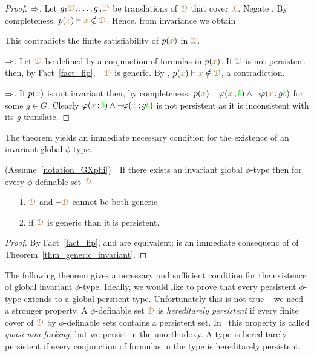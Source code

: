 \begin{proof}
  $\Rightarrow$.
  Let $g_1{\color{brown}\EuScript D},\dots,g_n{\color{brown}\EuScript D}$ be translations of ${\color{brown}\EuScript D}$ that cover ${\color{brown}\EuScript X}$.
  Negate .
  By completeness, $p({\color{brown} x})\vdash {\color{brown}x}\notin{\color{brown}\EuScript D}$.
  Hence, from invariance we obtain


  This contradicts the finite satisfiability of $p({\color{brown} x})$ in ${\color{brown}\EuScript X}$.
  
  $\Rightarrow$.
  Let ${\color{brown}\EuScript D}$ be defined by a conjunction of formulas in $p({\color{brown} x})$.
  If ${\color{brown}\EuScript D}$ is not persistent then, by Fact~\ref{fact_fip}, $\neg{\color{brown}\EuScript D}$ is generic. 
  By , $p({\color{brown} x})\vdash{\color{brown}x}\notin{\color{brown}\EuScript D}$, a contradiction.

  $\Rightarrow$.
  If $p({\color{brown} x})$ is not invariant then, by completeness, $p({\color{brown} x})\vdash\varphi({\color{brown} x}\,;{\color{green} b})\wedge\neg\varphi({\color{brown} x}\,;g{\color{green} b})$ for some $g\in G$.
  Clearly $\varphi({\color{brown} x}\,;{\color{green} b})\wedge\neg\varphi({\color{brown} x}\,;g{\color{green} b})$ is not persistent as it is inconsistent with its $g$-translate.
\end{proof}

The theorem yields an immediate necessary condition for the existence of an invariant global $\phi$-type.

\begin{corollary}
  (Assume~\ref{notation_GXphi})\ \  
  If there exists an invariant global $\phi$-type then for every $\phi$-definable set ${\color{brown}\EuScript D}$
  \begin{itemize}
    \item[1.] ${\color{brown}\EuScript D}$ and $\neg{\color{brown}\EuScript D}$ cannot be both generic
    \item[2.] if ${\color{brown}\EuScript D}$ is generic than it is persistent.
  \end{itemize}
\end{corollary}

\begin{proof}
  By Fact~\ref{fact_fip},  and  are equivalent;  is an immediate consequenc of  of Theorem~\ref{thm_generic_invariant}.
\end{proof}

The following theorem gives a necessary and sufficient condition for the  existence of global invariant $\phi$-type.
Ideally, we would like to prove that every persistent $\phi$-type extends to a global persitent type.
Unfortunately this is not true -- we need a stronger property.
A $\phi$-definable set ${\color{brown}\EuScript D}$ is \emph{hereditarely persistent\/} if every finite cover of ${\color{brown}\EuScript D}$ by $\phi$-definable sets contains a persistent set.
In~\cite{CK} this property is called \textit{quasi-non-forking,} but we persist in the unorthodoxy.
A type is hereditarely persistent if every conjunction of formulas in the type is hereditarely persistent.

